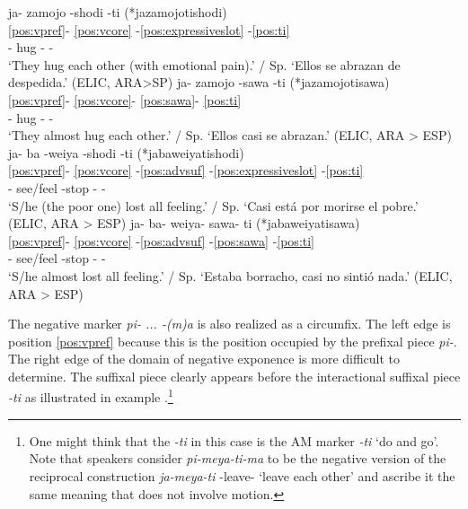 \documentclass[output=paper,hidelinks]{langscibook}
\begin{document}
\ea 
 \ea\label{ex:shoditi}
    \glll ja- zamojo -shodi -ti (*jazamojotishodi) \\
      \ref{pos:vpref}- \ref{pos:vcore} -\ref{pos:expressiveslot} -\ref{pos:ti} \\
     \Intrc{}- hug -\Emot{} -\Intrc{} \\
    \glt `They hug each other (with emotional pain).' / Sp. `Ellos se abrazan de despedida.'  \hfill (ELIC, ARA>SP)
 \ex \label{ex:sawati}
    \glll ja- zamojo -sawa -ti (*jazamojotisawa) \\
      \ref{pos:vpref}- \ref{pos:vcore}- \ref{pos:sawa}- \ref{pos:ti} \\
      \Intrc{}- hug -\Frust{} -\Intrc{} \\
    \glt `They almost hug each other.' / Sp. `Ellos casi se abrazan.'  \hfill (ELIC, ARA > ESP)
 \ex \label{ex:weiyashoditi}
    \glll ja- ba -weiya -shodi -ti (*jabaweiyatishodi) \\
      \ref{pos:vpref}- \ref{pos:vcore} -\ref{pos:advsuf} -\ref{pos:expressiveslot} -\ref{pos:ti} \\
     \Intrc{}- see/feel -stop -\Emot{} -\Intrc{}  \\
    \glt `S/he (the poor one) lost all feeling.' / Sp. `Casi está por morirse el pobre.'  \hfill (ELIC, ARA > ESP)
 \ex \label{ex:weiyasawati}
    \glll ja- ba- weiya- sawa- ti (*jabaweiyatisawa) \\
      \ref{pos:vpref}- \ref{pos:vcore} -\ref{pos:advsuf} -\ref{pos:sawa} -\ref{pos:ti} \\
      \Intrc{}- see/feel -stop -\Frust{} -\Intrc{}\\
    \glt `S/he almost lost all feeling.' / Sp. `Estaba borracho, casi no sintió nada.'  \hfill (ELIC, ARA > ESP)

 \z
\z 

The negative marker \textit{pi- ... -(m)a} is also realized as a circumfix. The left edge is position \ref{pos:vpref} because this is the position occupied by the prefixal piece \textit{pi-}. The right edge of the domain of negative exponence is more difficult to determine. The suffixal piece clearly appears before the interactional suffixal piece \textit{-ti} as illustrated in example .\footnote{One might think that the \textit{-ti} in this case is the AM marker \textit{-ti} `do and go'. Note that speakers consider \textit{pi-meya-ti-ma} to be the negative version of the reciprocal construction \textit{ja-meya-ti} \Intrc{}-leave-\Intrc{} `leave each other' and ascribe it the same meaning that does not involve motion.}
\end{document}
